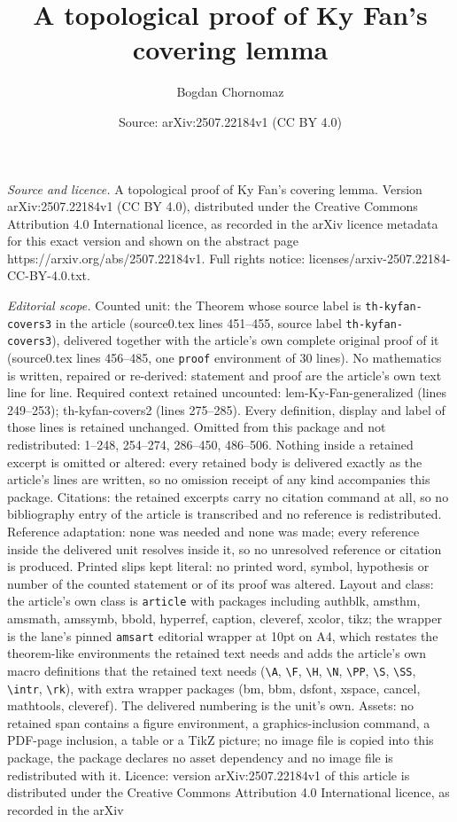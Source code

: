 \documentclass[10pt,a4paper]{amsart}
\title[A topological proof of Ky Fan's covering lemma]{A topological proof of Ky Fan's covering lemma}
\author{Bogdan Chornomaz}
\date{Source: arXiv:2507.22184v1 (CC BY 4.0)}
\begin{document}
\maketitle

\noindent\emph{Source and licence.} A topological proof of Ky Fan's covering lemma. Version arXiv:2507.22184v1 (CC BY 4.0), distributed under the Creative Commons Attribution 4.0 International licence, as recorded in the arXiv licence metadata for this exact version and shown on the abstract page https://arxiv.org/abs/2507.22184v1. Full rights notice: licenses/arxiv-2507.22184-CC-BY-4.0.txt.\par\smallskip

\noindent\textit{Editorial scope.} Counted unit: the Theorem whose source label is \texttt{th-kyfan-covers3} in the article (source0.tex lines 451--455, source label \texttt{th-kyfan-covers3}), delivered together with the article's own complete original proof of it (source0.tex lines 456--485, one \texttt{proof} environment of 30 lines). No mathematics is written, repaired or re-derived: statement and proof are the article's own text line for line. Required context retained uncounted: lem-Ky-Fan-generalized (lines 249--253); th-kyfan-covers2 (lines 275--285). Every definition, display and label of those lines is retained unchanged. Omitted from this package and not redistributed: 1--248, 254--274, 286--450, 486--506. Nothing inside a retained excerpt is omitted or altered: every retained body is delivered exactly as the article's lines are written, so no omission receipt of any kind accompanies this package. Citations: the retained excerpts carry no citation command at all, so no bibliography entry of the article is transcribed and no reference is redistributed. Reference adaptation: none was needed and none was made; every reference inside the delivered unit resolves inside it, so no unresolved reference or citation is produced. Printed slips kept literal: no printed word, symbol, hypothesis or number of the counted statement or of its proof was altered. Layout and class: the article's own class is \texttt{article} with packages including authblk, amsthm, amsmath, amssymb, bbold, hyperref, caption, cleveref, xcolor, tikz; the wrapper is the lane's pinned \texttt{amsart} editorial wrapper at 10pt on A4, which restates the theorem-like environments the retained text needs and adds the article's own macro definitions that the retained text needs (\texttt{\textbackslash A}, \texttt{\textbackslash F}, \texttt{\textbackslash H}, \texttt{\textbackslash N}, \texttt{\textbackslash PP}, \texttt{\textbackslash S}, \texttt{\textbackslash SS}, \texttt{\textbackslash intr}, \texttt{\textbackslash rk}), with extra wrapper packages (bm, bbm, dsfont, xspace, cancel, mathtools, cleveref). The delivered numbering is the unit's own. Assets: no retained span contains a figure environment, a graphics-inclusion command, a PDF-page inclusion, a table or a TikZ picture; no image file is copied into this package, the package declares no asset dependency and no image file is redistributed with it. Licence: version arXiv:2507.22184v1 of this article is distributed under the Creative Commons Attribution 4.0 International licence, as recorded in the arXiv 
\end{document}

